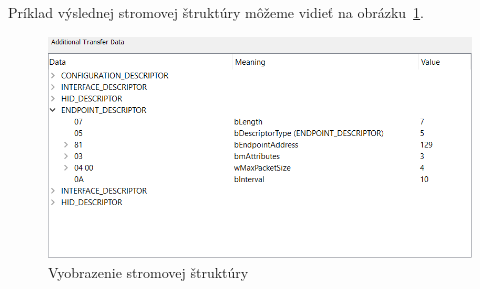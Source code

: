 Príklad výslednej stromovej štruktúry môžeme vidieť na obrázku~\ref{obr:kap3:tree_view}.

\begin{figure}[!htb]
	\centering
	\includegraphics[width=\textwidth]{img/kap03_tree_view}
	\caption{Vyobrazenie stromovej štruktúry}
	\label{obr:kap3:tree_view}
\end{figure}